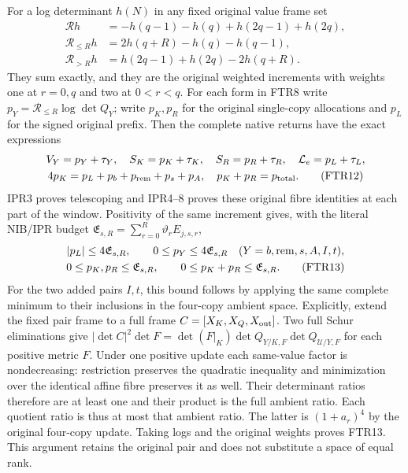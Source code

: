 \documentclass[11pt,a4paper]{article}
\begin{document}
For a log determinant $h(N)$ in any fixed original value frame set
\[
\begin{aligned}
 \mathcal Rh&=-h(q-1)-h(q)+h(2q-1)+h(2q),\\
 \mathcal R_{\le R}h&=2h(q+R)-h(q)-h(q-1),\\
 \mathcal R_{>R}h&=h(2q-1)+h(2q)-2h(q+R).
\end{aligned}                                                   \tag{FTR11}
\]
They sum exactly, and they are the original weighted increments
with weights one at $r=0,q$ and two at $0<r<q$.
For each form in FTR8 write $p_Y=\mathcal R_{\le R}\log\det Q_Y$;
write $p_K,p_R$ for the original single-copy allocations and
$p_L$ for the signed original prefix. Then the complete native
returns have the exact expressions
\[
\begin{gathered}
 V_Y=p_Y+\tau_Y,\quad S_K=p_K+\tau_K,\quad
 S_R=p_R+\tau_R,\quad \mathcal L_e=p_L+\tau_L,\\
 4p_K=p_L+p_b+p_{\rm rem}+p_s+p_A,\quad
 p_K+p_R=p_{\rm total}.                                 \tag{FTR12}
\end{gathered}
\]
IPR3 proves telescoping and IPR4--8 proves these original fibre
identities at each part of the window. Positivity of the same
increment gives, with the literal NIB/IPR budget
$\mathfrak E_{s,R}=\sum_{r=0}^R\vartheta_rE_{j,s,r}$,
\[
\begin{gathered}
 |p_L|\le4\mathfrak E_{s,R},\qquad
 0\le p_Y\le4\mathfrak E_{s,R}\quad
       (Y=b,{\rm rem},s,A,I,t),\\
 0\le p_K,p_R\le\mathfrak E_{s,R},\qquad
 0\le p_K+p_R\le\mathfrak E_{s,R}.                       \tag{FTR13}
\end{gathered}
\]
For the two added pairs $I,t$, this bound follows by applying
the same complete minimum to their inclusions in the four-copy
ambient space. Explicitly, extend the fixed pair frame to a full
frame $C=[X_K,X_Q,X_{\rm out}]$. Two full Schur eliminations give
$|\det C|^2\det F=
\det(F|_K)\det Q_{Y/K,F}\det Q_{\mathcal U/Y,F}$
for each positive metric $F$. Under one positive update each
same-value factor is nondecreasing: restriction preserves the
quadratic inequality and minimization over the identical affine
fibre preserves it as well. Their determinant ratios therefore
are at least one and their product is the full ambient ratio.
Each quotient ratio is thus at most that ambient ratio. The latter
is $(1+a_r)^4$ by the original four-copy update. Taking logs
and the original weights proves FTR13. This argument retains
the original pair and does not substitute a space of equal rank.
\end{document}

